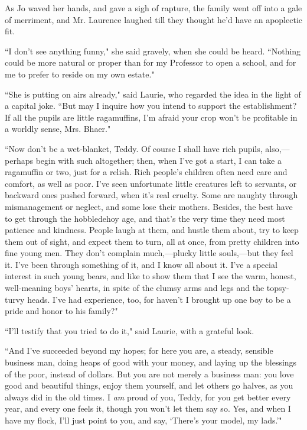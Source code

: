 As Jo waved her hands, and gave a sigh of rapture, the family went off
into a gale of merriment, and Mr. Laurence laughed till they thought
he'd have an apoplectic fit.

``I don't see anything funny," she said gravely, when she
could be heard. ``Nothing could be more natural or proper than for my
Professor to open a school, and for me to prefer to reside on my own
estate."

``She is putting on airs already," said Laurie, who regarded the idea in
the light of a capital joke. ``But may I inquire how you intend to
support the establishment? If all the pupils are little ragamuffins,
I'm afraid your crop won't be profitable
in a worldly sense, Mrs. Bhaer."

``Now don't be a wet-blanket, Teddy. Of course I shall
have rich pupils, also,---perhaps begin with such altogether; then, when
I've got a start, I can take a ragamuffin or two, just
for a relish. Rich people's children often need care and
comfort, as well as poor. I've seen unfortunate little
creatures left to servants, or backward ones pushed forward, when
it's real cruelty. Some are naughty through
mismanagement or neglect, and some lose their mothers. Besides, the best
have to get through the hobbledehoy age, and that's the
very time they need most patience and kindness. People laugh at them,
and hustle them about, try to keep them out of sight, and expect them to
turn, all at once, from pretty children into fine young men. They
don't complain much,---plucky little souls,---but they
feel it. I've been through something of it, and I know
all about it. I've a special interest in such young
bears, and like to show them that I see the warm, honest, well-meaning
boys' hearts, in spite of the clumsy arms and legs and
the topsy-turvy heads. I've had experience, too, for
haven't I brought up one boy to be a pride and honor to
his family?"

``I'll testify that you tried to do it," said Laurie,
with a grateful look.

``And I've succeeded beyond my hopes; for here you are, a
steady, sensible business man, doing heaps of good with your money, and
laying up the blessings of the poor, instead of dollars. But you are not
merely a business man: you love good and beautiful things, enjoy them
yourself, and let others go halves, as you always did in the old times.
I \emph{am} proud of you, Teddy, for you get better every year, and
every one feels it, though you won't let them say so.
Yes, and when I have my flock, I'll just point to you,
and say, `There's your model, my
lads.'"

